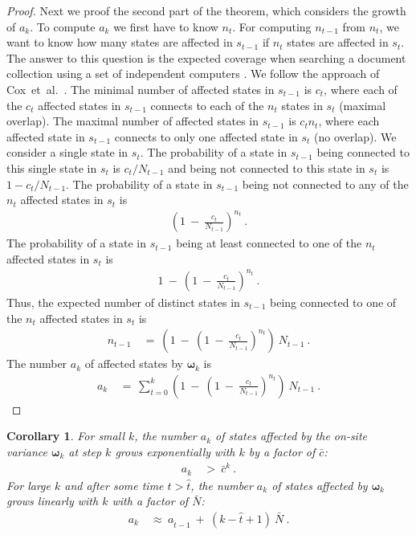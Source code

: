 \documentclass{article}
\newtheorem{corollaryA}{Corollary}\newtheorem{propositionA}{Proposition}\newtheorem{lemmaA}{Lemma}\newtheorem{conjectureA}{Conjecture}
\newcommand\Bom{\bm{\omega}}
\begin{document}
\begin{appendices}
\begin{proof}
Next we proof the second part of the theorem, which considers the
growth of $a_k$.
To compute $a_k$ we first have
to know $n_t$. For computing $n_{t-1}$ from $n_t$, we want to know how
many states are affected in $s_{t-1}$ if $n_t$
states are affected in $s_t$.
The answer to this question is the expected
coverage when searching a document collection
using a set of independent computers \cite{Cox:09}.  
We follow the approach of Cox~et~al.\ \cite{Cox:09}.
The minimal number of affected states in $s_{t-1}$ is $c_t$, where
each of the $c_t$ affected states in $s_{t-1}$ 
connects to each of the $n_t$ states in $s_t$ (maximal overlap).
The maximal number of affected states in $s_{t-1}$ is
$c_t n_t$, where each affected state in $s_{t-1}$
connects to only one affected state in $s_t$ (no overlap).
We consider a single state in $s_t$.
The probability of a state in $s_{t-1}$ being connected to this single
state in $s_t$ is $c_t/N_{t-1}$ and being not connected to this state in
$s_t$ is $1 - c_t/N_{t-1}$.
The probability of a state in $s_{t-1}$
being not connected to any of the $n_t$ affected states in $s_t$ is
\begin{align}
  \left( 1 \ - \ \frac{c_t}{N_{t-1}} \right)^{n_t} \ .
\end{align}
The probability of a state in $s_{t-1}$
being at least connected to one of the $n_t$ affected states in $s_t$ is
\begin{align}
  1 \ - \   \left( 1 \ - \ \frac{c_t}{N_{t-1}} \right)^{n_t} \ .
\end{align}
Thus, the expected number of distinct states in $s_{t-1}$ being
connected to one of the $n_t$ affected states in $s_t$ is
\begin{align}
 n_{t-1}   \ &= \ \left( 1 \ - \   \left( 1 \ - \ \frac{c_t}{N_{t-1}} \right)^{n_t}
  \right) \ N_{t-1} \ .
\end{align}
The number $a_k$ of affected states by $\Bom_k$ is
\begin{align}
 a_k   \ &= \ \sum_{t=0}^k \left( 1 \ - \   \left( 1 \ - \ \frac{c_t}{N_{t-1}} \right)^{n_t}
  \right) \ N_{t-1} \ .
\end{align}
\end{proof}

\begin{corollaryA}
\label{th:Acoro}
 For small $k$, the number $a_k$ of states affected by
the on-site variance $\Bom_k$ at step $k$
grows exponentially with $k$ by a factor of $\bar{c}$: 
\begin{align}
  a_k \ &> \ \bar{c}^k \ .
\end{align}
For large $k$ and after some time $t>\hat{t}$,
the number $a_k$ of states affected by
$\Bom_k$ grows linearly with $k$ with a factor of $\bar{N}$: 
\begin{align}
  a_k \ &\approx \  a_{\hat{t}-1} \ + \ (k-\hat{t}+1) \ \bar{N} \ .
\end{align}
\end{corollaryA}


\end{appendices}
\end{document}
